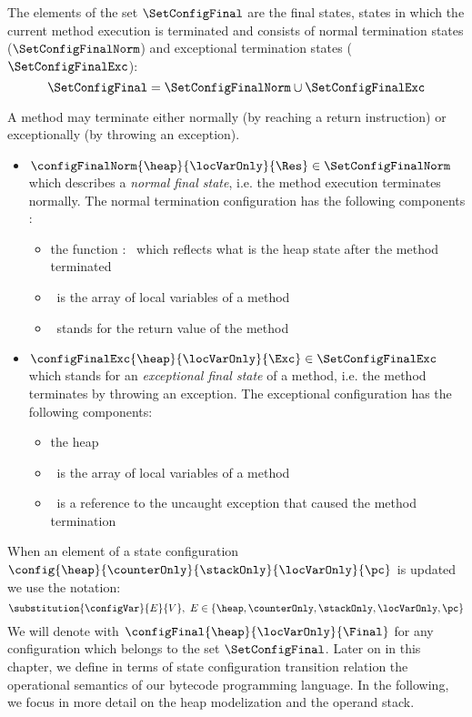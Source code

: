  The elements of the set $\SetConfigFinal$ are the final states, states in which the current method execution is terminated and consists of 
 normal termination states ($\SetConfigFinalNorm$) and exceptional termination states ($\SetConfigFinalExc$):
 $$\SetConfigFinal =  \SetConfigFinalNorm   \cup \SetConfigFinalExc $$ 
 
 A method may terminate either normally (by reaching a return instruction) or exceptionally (by throwing an exception).
 
 \begin{itemize}
        \item  $\configFinalNorm{\heap}{\locVarOnly}{\Res} \in \SetConfigFinalNorm $ which describes a \textit{normal final state}, i.e.
	       the method execution terminates normally. The normal termination configuration has the following components :
               \begin{itemize}
                      \item the function \heap : \HeapSet \ which reflects what is the heap state after the method terminated
		      \item \locVarOnly \  is the array of local variables of a method 
		      \item \Res \ stands for the return value  of the method
	       \end{itemize}

	\item  $\configFinalExc{\heap}{\locVarOnly}{\Exc} \in \SetConfigFinalExc $ which stands for an 
               \textit{exceptional final state} of a method,
	       i.e. the method terminates by throwing an exception. The exceptional configuration has the following components:
               \begin{itemize}
                      \item the heap \heap 
		      \item \locVarOnly \ is the array of local variables of a method
		      \item \Exc \ is a reference to the uncaught exception that caused the method termination
               \end{itemize}

 \end{itemize}
  
 When an element of a state configuration $\config{\heap}{\counterOnly}{ \stackOnly }{\locVarOnly}{\pc}$ is updated 
 we use the notation: 
 $$ \substitution{\configVar}{ E}{ V}   , \ E \in \{ \heap, \counterOnly, \stackOnly, \locVarOnly, \pc \} $$   
 We will denote with $\configFinal{\heap}{\locVarOnly}{\Final}$ for any configuration which belongs to the set  $\SetConfigFinal$. 
 Later on in this chapter, we define in terms of state configuration transition relation the operational semantics of
 our bytecode programming language.
 In the following, we focus in more detail on the heap modelization and the operand stack. 
